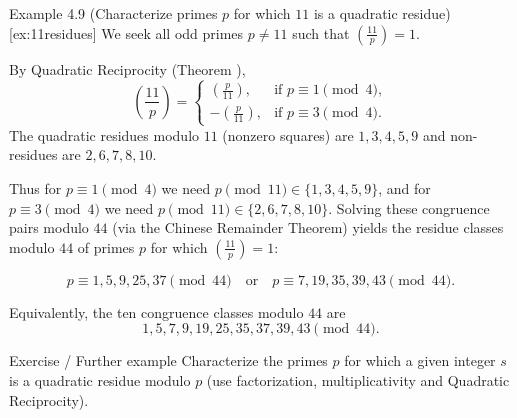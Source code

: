\documentclass[10pt]{article}
\theoremstyle{definition}
\theoremstyle{plain}
\numberwithin{equation}{section}
\begin{document}
\begin{define}{Example 4.9 (Characterize primes $p$ for which $11$ is a quadratic residue)}[ex:11residues]
We seek all odd primes $p\ne 11$ such that $(\tfrac{11}{p})=1$.

By Quadratic Reciprocity (Theorem ),
\[
\left(\frac{11}{p}\right)=
\begin{cases}
\left(\frac{p}{11}\right), &\text{if } p\equiv 1\pmod 4,\\[4pt]
-\left(\frac{p}{11}\right), &\text{if } p\equiv 3\pmod 4.
\end{cases}
\]
The quadratic residues modulo $11$ (nonzero squares) are $1,3,4,5,9$ and non-residues are $2,6,7,8,10$.

Thus for $p\equiv 1\pmod4$ we need $p\pmod{11}\in\{1,3,4,5,9\}$, and for $p\equiv 3\pmod4$ we need $p\pmod{11}\in\{2,6,7,8,10\}$. Solving these congruence pairs modulo $44$ (via the Chinese Remainder Theorem) yields the residue classes modulo $44$ of primes $p$ for which $(\tfrac{11}{p})=1$:

\[
p\equiv 1,5,9,25,37 \pmod{44} \quad\text{or}\quad
p\equiv 7,19,35,39,43 \pmod{44}.
\]

Equivalently, the ten congruence classes modulo $44$ are
\[
1,5,7,9,19,25,35,37,39,43\pmod{44}.
\]
\end{define}

\bigskip

\begin{define}{Exercise / Further example}
Characterize the primes $p$ for which a given integer $s$ is a quadratic residue modulo $p$ (use factorization, multiplicativity and Quadratic Reciprocity).
\end{define}

\end{document}
